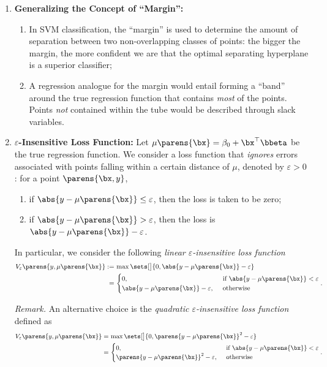 \documentclass[12pt]{article}
\begin{document}
\begin{enumerate}[label=\textbf{\arabic*.}]
	
	\item \textbf{Generalizing the Concept of ``Margin'':}
	\begin{enumerate}
		\item In SVM classification, the ``margin'' is used to determine the amount of separation between two non-overlapping classes of points: the bigger the margin, the more confident we are that the optimal separating hyperplane is a superior classifier;
		\item A regression analogue for the margin would entail forming a ``band'' around the true regression function that contains \emph{most} of the points. Points \emph{not} contained within the tube would be described through slack variables. 
	\end{enumerate}
	
	\item \textbf{$\varepsilon$-Insensitive Loss Function:} Let $\mu \parens{\bx} = \beta_0 + \bx^\top \bbeta$ be the true regression function. We consider a loss function that \emph{ignores} errors associated with points falling within a certain distance of $\mu$, denoted by $\varepsilon > 0$: for a point $\parens{\bx, y}$, 
	\begin{enumerate}
		\item if $\abs{y - \mu \parens{\bx}} \le \varepsilon$, then the loss is taken to be zero; 
		\item if $\abs{y - \mu \parens{\bx}} > \varepsilon$, then the loss is $\abs{y - \mu \parens{\bx}} - \varepsilon$. 
	\end{enumerate}
	In particular, we consider the following \textit{linear $\varepsilon$-insensitive loss function}
	\begin{align*}
		V_{\varepsilon} \parens{y, \mu \parens{\bx}} := & \, \max \sets[\big]{0, \abs{y - \mu \parens{\bx}} - \varepsilon} \\ 
		= & \, \begin{cases}
			0, & \, \text{ if } \abs{y - \mu \parens{\bx}} < \varepsilon \\ 
			\abs{y - \mu \parens{\bx}} - \varepsilon, & \, \text{ otherwise}
		\end{cases}. 
	\end{align*}
	
	\textit{Remark.} An alternative choice is the \textit{quadratic $\varepsilon$-insensitive loss function} defined as 
	\begin{align*}
		V_{\varepsilon} \parens{y, \mu \parens{\bx}} = & \, \max \sets[\big]{0, \parens{y - \mu \parens{\bx}}^2 - \varepsilon} \\ 
		= & \, \begin{cases}
			0, & \, \text{ if } \abs{y - \mu \parens{\bx}} < \varepsilon \\ 
			\parens{y - \mu \parens{\bx}}^2 - \varepsilon, & \, \text{ otherwise}
		\end{cases}. 
	\end{align*}
	

\end{enumerate}
\end{document}
